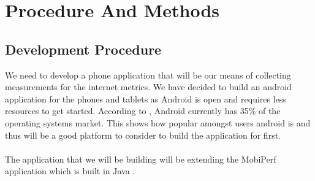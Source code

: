 \section{Procedure And Methods}
\subsection{Development Procedure}
We need to develop a phone application that will be our means of collecting measurements for the internet metrics. We have decided to build an android application for the phones and tablets as Android is open and requires less resources to get started. According to \cite{statcounter_global_stats}, Android currently has 35\% of the operating systems market. This shows how popular amongst users android is and thus will be a good platform to consider to build the application for first. 
\paragraph{}
The application that we will be building will be extending the MobiPerf application which is built in Java \cite{m}.